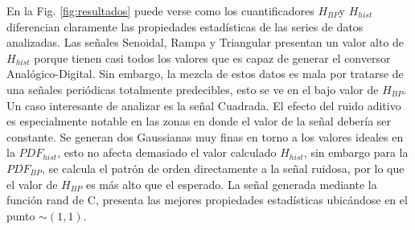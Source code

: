 En la Fig. \ref{fig:resultados} puede verse como los cuantificadores $H_{BP}$y $H_{hist}$ diferencian claramente las propiedades estadísticas de las series de datos analizadas.
Las señales Senoidal, Rampa y Triangular presentan un valor alto de $H_{hist}$ porque tienen casi todos los valores que es capaz de generar el conversor Analógico-Digital.
Sin embargo, la mezcla de estos datos es mala por tratarse de una señales periódicas totalmente predecibles, esto se ve en el bajo valor de $H_{BP}$.
Un caso interesante de analizar es la señal Cuadrada.
El efecto del ruido aditivo es especialmente notable en las zonas en donde el valor de la señal debería ser constante.
Se generan dos Gaussianas muy finas en torno a los valores ideales en la $PDF_{hist}$, esto no afecta demasiado el valor calculado $H_{hist}$, sin embargo para la $PDF_{BP}$, se calcula el patrón de orden directamente a la señal ruidosa, por lo que el valor de $H_{BP}$ es más alto que el esperado.
La señal generada mediante la función rand de C, presenta las mejores propiedades estadísticas ubicándose en el punto $\sim(1,1)$.